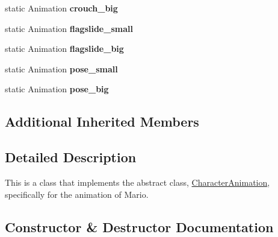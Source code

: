 \begin{DoxyCompactItemize}
static Animation {\bfseries crouch\+\_\+big}
\item 
\mbox{\label{classnl_1_1arjanfrans_1_1mario_1_1graphics_1_1MarioAnimation_aa06a8c57d4612d85fb944cedca8c9298}} 
static Animation {\bfseries flagslide\+\_\+small}
\item 
\mbox{\label{classnl_1_1arjanfrans_1_1mario_1_1graphics_1_1MarioAnimation_a155d95a2c30ff796fda2a9e418d7c19b}} 
static Animation {\bfseries flagslide\+\_\+big}
\item 
\mbox{\label{classnl_1_1arjanfrans_1_1mario_1_1graphics_1_1MarioAnimation_a03ad11c621a17cfffaad8f0973bece7e}} 
static Animation {\bfseries pose\+\_\+small}
\item 
\mbox{\label{classnl_1_1arjanfrans_1_1mario_1_1graphics_1_1MarioAnimation_a2add793b8c9cae8344f6f63b63a02724}} 
static Animation {\bfseries pose\+\_\+big}
\end{DoxyCompactItemize}
\subsection*{Additional Inherited Members}


\subsection{Detailed Description}
This is a class that implements the abstract class, \hyperlink{classnl_1_1arjanfrans_1_1mario_1_1graphics_1_1CharacterAnimation}{Character\+Animation}, specifically for the animation of Mario. 

\subsection{Constructor \& Destructor Documentation}
\mbox{\label{classnl_1_1arjanfrans_1_1mario_1_1graphics_1_1MarioAnimation_a15feb12f385241d47dfc71e2c90a8d06}} 
